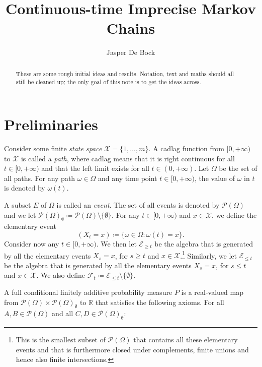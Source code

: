 \documentclass[a4paper,reqno]{amsart}
\newcommand{\reals}{\mathbb{R}}
\newcommand{\states}{\mathcal{X}}
\newcommand{\paths}{\Omega}
\newcommand{\path}{\omega}
\newcommand{\power}{\mathcal{P}(\paths)}
\newcommand{\nonemptypower}{\power_{\emptyset}}
\newcommand{\events}{\mathcal{E}}
\newcommand{\filter}[1][t]{\mathcal{F}_{#1}}
\begin{document}
\title{Continuous-time Imprecise Markov Chains}
\author{Jasper De Bock}

\begin{abstract}
These are some rough initial ideas and results. Notation, text and maths should all still be cleaned up; the only goal of this note is to get the ideas across.
\end{abstract}

\maketitle

\section{Preliminaries}

Consider some finite \emph{state space} $\states=\{1,\dots,m\}$. A cadlag function from $[0,+\infty)$ to $\states$ is called a \emph{path}, where cadlag means that it is right continuous for all $t\in[0,+\infty)$ and that the left limit exists for all $t\in(0,+\infty)$. Let $\paths$ be the set of all paths. For any path $\path\in\paths$ and any time point $t\in[0,+\infty)$, the value of $\path$ in $t$ is denoted by $\path(t)$.

A subset $E$ of $\paths$ is called an \emph{event}. The set of all events is denoted by $\power$ and we let $\nonemptypower\coloneqq\power\setminus\{\emptyset\}$. For any $t\in[0,+\infty)$ and $x\in\states$, we define the elementary event
\begin{equation*}
(X_t=x)\coloneqq\{\path\in\paths\colon\path(t)=x\}.
\end{equation*}
Consider now any $t\in[0,+\infty)$. We then let $\events_{\geq t}$ be the algebra that is generated by all the elementary events $X_s=x$, for $s\geq t$ and $x\in\states$.\footnote{This is the smallest subset of $\power$ that contains all these elementary events and that is furthermore closed under complements, finite unions and hence also finite intersections.} Similarly, we let $\events_{\leq t}$ be the algebra that is generated by all the elementary events $X_s=x$, for $s\leq t$ and $x\in\states$. We also define $\filter\coloneqq\events_{\leq t}\setminus\{\emptyset\}$.

A full conditional finitely additive probability measure $P$ is a real-valued map from $\power\times\nonemptypower$ to $\reals$ that satisfies the following axioms. For all $A,B\in\power$ and all \mbox{$C,D\in\nonemptypower$}:
\vspace{5pt}
\end{document}
